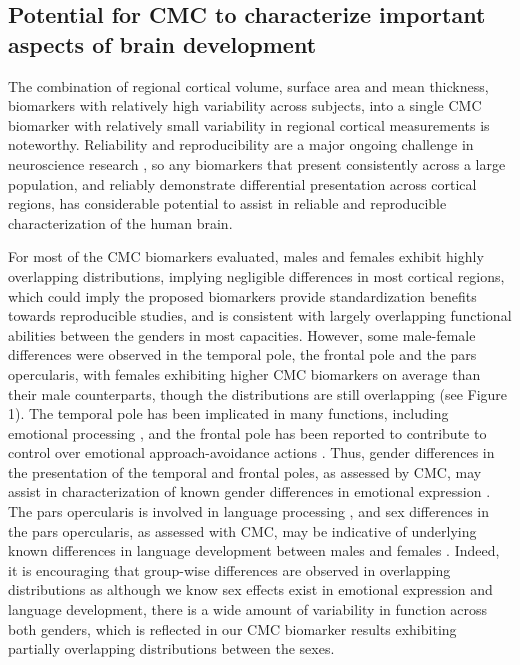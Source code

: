 \documentclass{article}
\begin{document}
\subsection{Potential for CMC to characterize important aspects of brain development}

The combination of regional cortical volume, surface area and mean thickness,
biomarkers with relatively high variability across subjects, into a single
CMC biomarker with relatively small variability in regional cortical
measurements is noteworthy. Reliability and reproducibility are a major
ongoing challenge in neuroscience research
\citep{martinezReproducibilityBraincognitionRelationships2015,marekReproducibleBrainwideAssociation2022},
so any biomarkers that present consistently across a large population, and
reliably demonstrate differential presentation across cortical regions, has
considerable potential to assist in reliable and reproducible
characterization of the human brain.

For most of the CMC biomarkers evaluated, males and females exhibit highly
overlapping distributions, implying negligible differences in most cortical
regions, which could imply the proposed biomarkers provide standardization
benefits towards reproducible studies, and is consistent with largely
overlapping functional abilities between the genders in most capacities.
However, some male-female differences were observed in the temporal pole, the
frontal pole and the pars opercularis, with females exhibiting higher CMC
biomarkers on average than their male counterparts, though the distributions
are still overlapping (see Figure 1). The temporal pole has been implicated
in many functions, including emotional processing
\citep{corcoles-paradaFrontalInsularInput2019}, and the frontal pole has been
reported to contribute to control over emotional approach-avoidance actions
\citep{bramsonHumanLateralFrontal2020}. Thus, gender differences in the
presentation of the temporal and frontal poles, as assessed by CMC, may
assist in characterization of known gender differences in emotional
expression \citep{chaplinGenderEmotionExpression2015}. The pars opercularis
is involved in language processing \citep{greweEmergenceUnmarkedNew2005}, and
sex differences in the pars opercularis, as assessed with CMC, may be
indicative of underlying known differences in language development between
males and females \citep{satoNeurobiologySexDifferences2020}. Indeed, it is
encouraging that group-wise differences are observed in overlapping
distributions as although we know sex effects exist in emotional expression
and language development, there is a wide amount of variability in function
across both genders, which is reflected in our CMC biomarker results
exhibiting partially overlapping distributions between the sexes.
\end{document}
